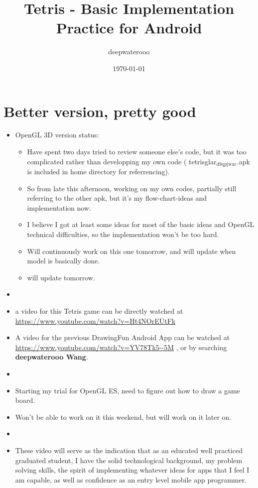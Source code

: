 \documentclass[9pt,b5paper]{article}
\author{deepwaterooo}
\date{\today}
\title{Tetris - Basic Implementation Practice for Android}
\begin{document}
\maketitle
\tableofcontents


\section{Better version, pretty good}
\label{sec-1}
\begin{itemize}
\item OpenGL 3D version status: 
\begin{itemize}
\item Have spent two days tried to review someone else's code, but it was too complicated rather than developping my own code ( tetrisglar$_{\text{d9qpjwxc}}$.apk is included in home directory for referrencing).
\item So from late this afternoon, working on my own codes, partially still referring to the other apk, but it's my flow-chart-ideas and implementation now.
\item I believe I got at least some ideas for most of the basic ideas and OpenGL technical difficulties, so the implementation won't be too hard.
\item Will continuously work on this one tomorrow, and will update when model is basically done.
\item will update tomorrow.
\end{itemize}
\item 
\item a video for this Tetris game can be directly watched at \url{https://www.youtube.com/watch?v=Ht4NOrEUtFk}
\item A video for the previous DrawingFun Android App can be watched at \url{https://www.youtube.com/watch?v=YV78Tk5--5M} , or by searching \textbf{deepwaterooo Wang}.
\item 
\item Starting my trial for OpenGL ES, need to figure out how to draw a game board.
\item Won't be able to work on it this weekend, but will work on it later on.
\item 
\item These video will serve as the indication that as an educated well practiced graduated student, I have the solid technological background, my problem solving skills, the spirit of implementing whatever ideas for apps that I feel I am capable, as well as confidence as an entry level mobile app programmer.

\end{itemize}
\end{document}
